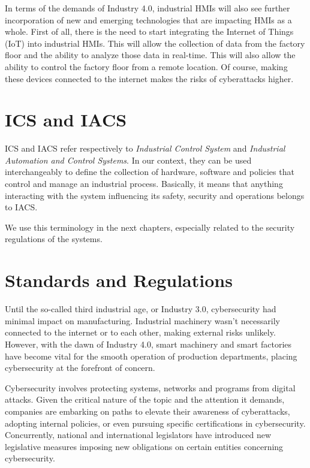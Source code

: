 In terms of the demands of Industry 4.0, industrial HMIs will also see further incorporation of new and emerging technologies that are impacting HMIs as a whole. First of all, there is the need to start integrating the Internet of Things (IoT) into industrial HMIs. This will allow the collection of data from the factory floor and the ability to analyze those data in real-time. This will also allow the ability to control the factory floor from a remote location. Of course, making these devices connected to the internet makes the risks of cyberattacks higher.

\section{ICS and IACS}

ICS and IACS refer respectively to \textit{Industrial Control System} and \textit{Industrial Automation and Control Systems}. In our context, they can be used interchangeably to define the collection of hardware, software and policies that control and manage an industrial process. Basically, it means that anything interacting with the system influencing its safety, security and operations belongs to IACS.~\cite{ics-or-iacs}

We use this terminology in the next chapters, especially related to the security regulations of the systems.

\section{Standards and Regulations}
Until the so-called third industrial age, or Industry 3.0, cybersecurity had minimal impact on manufacturing. Industrial machinery wasn't necessarily connected to the internet or to each other, making external risks unlikely. However, with the dawn of Industry 4.0, smart machinery and smart factories have become vital for the smooth operation of production departments, placing cybersecurity at the forefront of concern.

Cybersecurity involves protecting systems, networks and programs from digital attacks. Given the critical nature of the topic and the attention it demands, companies are embarking on paths to elevate their awareness of cyberattacks, adopting internal policies, or even pursuing specific certifications in cybersecurity. Concurrently, national and international legislators have introduced new legislative measures imposing new obligations on certain entities concerning cybersecurity.

